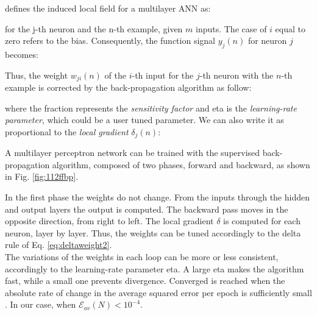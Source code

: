 \citet {RefWorks:158} defines the induced local field for a multilayer
\acs{ANN} as:

for the j-th neuron and the n-th example, given $m$ inputs.
The case of $i$ equal to zero refers to the bias.
Consequently, the function signal $y_j(n)$ for neuron $j$ becomes: 

Thus, the weight $w_{ji}(n)$ of the $i$-th input for the $j$-th neuron
with the $n$-th example is corrected by the back-propagation algorithm as
follow:

where the fraction represents the \textit{sensitivity factor} and \acs{eta} is
the \textit{learning-rate parameter}, which could be a user tuned parameter.
We can also write it as proportional to the \textit{local gradient}
$\delta_j(n)$:

A multilayer perceptron network can be trained with the
supervised back-propagation algorithm, composed of two phases, forward and
backward, as shown in Fig. \ref{fig:112ffbp}.

In the first phase the weights do not change. 
From the inputs through the hidden
and output layers the output is computed.
The backward pass moves in the opposite direction, from right to left.
The local gradient $\delta$ is computed for each neuron, layer by layer.
Thus, the weights can be tuned accordingly to the delta rule of Eq.
\ref{eq:deltaweight2}.\\
The variations of the weights in each loop can be more or less consistent,
accordingly to the learning-rate parameter \acs{eta}. 
A large \acs{eta} makes the algorithm fast,
while a small one prevents divergence.
Converged is reached when the absolute rate of change in the average squared
error per epoch is sufficiently small \cite {RefWorks:158}.
In our case, when $\mathscr{E}_{av}(N) < 10^{-4}$.\\


% 

